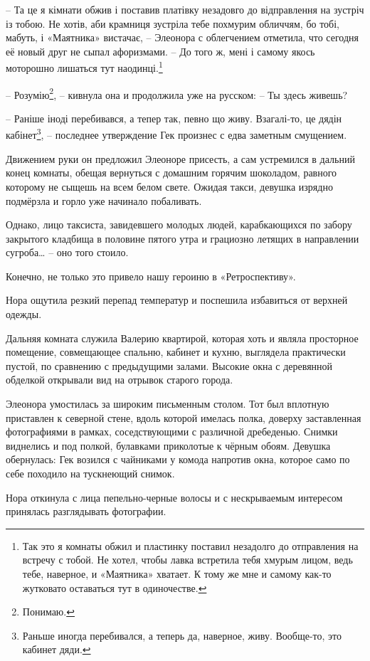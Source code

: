 \documentclass[
  a5paperpaper,
  DIV=11,
  numbers=noendperiod]{scrreprt}
\begin{document}
-- Та це я кімнати обжив і поставив платівку незадовго до відправлення
на зустріч із тобою. Не хотів, аби крамниця зустріла тебе похмурим
обличчям, бо тобі, мабуть, і «Маятника» вистачає, -- Элеонора с
облегчением отметила, что сегодня её новый друг не сыпал афоризмами. --
До того ж, мені і самому якось моторошно лишаться тут
наодинці.\footnote{Так это я комнаты обжил и пластинку поставил
  незадолго до отправления на встречу с тобой. Не хотел, чтобы лавка
  встретила тебя хмурым лицом, ведь тебе, наверное, и «Маятника»
  хватает. К тому же мне и самому как-то жутковато оставаться тут в
  одиночестве.}

-- Розумію\footnote{Понимаю.}, -- кивнула она и продолжила уже на
русском: -- Ты здесь живешь?

-- Раніше іноді перебивався, а тепер так, певно що живу. Взагалі-то, це
дядін кабінет\footnote{Раньше иногда перебивался, а теперь да, наверное,
  живу. Вообще-то, это кабинет дяди.}, -- последнее утверждение Гек
произнес с едва заметным смущением.

Движением руки он предложил Элеоноре присесть, а сам устремился в
дальний конец комнаты, обещая вернуться с домашним горячим шоколадом,
равного которому не сыщешь на всем белом свете. Ожидая такси, девушка
изрядно подмёрзла и горло уже начинало побаливать.

Однако, лицо таксиста, завидевшего молодых людей, карабкающихся по
забору закрытого кладбища в половине пятого утра и грациозно летящих в
направлении сугроба\ldots{} -- оно того стоило.

Конечно, не только это привело нашу героиню в «Ретроспективу».

Нора ощутила резкий перепад температур и поспешила избавиться от верхней
одежды.

Дальняя комната служила Валерию квартирой, которая хоть и являла
просторное помещение, совмещающее спальню, кабинет и кухню, выглядела
практически пустой, по сравнению с предыдущими залами. Высокие окна с
деревянной обделкой открывали вид на отрывок старого города.

Элеонора умостилась за широким письменным столом. Тот был вплотную
приставлен к северной стене, вдоль которой имелась полка, доверху
заставленная фотографиями в рамках, соседствующими с различной
дребеденью. Снимки виднелись и под полкой, булавками приколотые к чёрным
обоям. Девушка обернулась: Гек возился с чайниками у комода напротив
окна, которое само по себе походило на тускнеющий снимок.

Нора откинула с лица пепельно-черные волосы и с нескрываемым интересом
принялась разглядывать фотографии.
\end{document}
